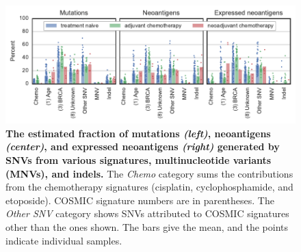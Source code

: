 \begin{figure}[htbp]
\centering
\includegraphics[scale=1.0]{figures/sources_of_mutations_and_neoantigens.pdf}
\caption{\textbf{The estimated fraction of mutations \textit{(left)}, neoantigens \textit{(center)}, and expressed neoantigens \textit{(right)} generated by SNVs from various signatures, multinucleotide variants (MNVs), and indels.} The \textit{Chemo} category sums the contributions from the chemotherapy signatures (cisplatin, cyclophosphamide, and etoposide). COSMIC signature numbers are in parentheses. The \textit{Other SNV} category shows SNVs attributed to COSMIC signatures other than the ones shown. The bars give the mean, and the points indicate individual samples.}
\label{fig:sources}
\end{figure}